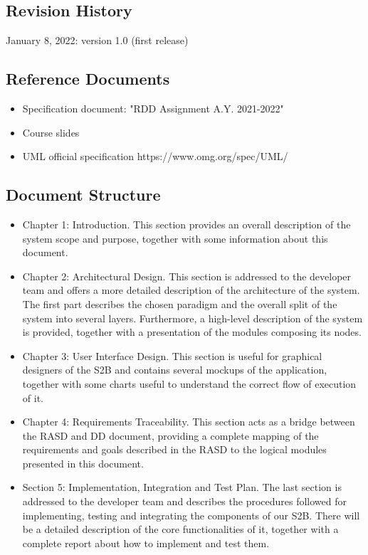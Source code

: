 \documentclass{article}
\begin{document}
\subsection{Revision History}
January 8, 2022: version 1.0 (first release)

\subsection{Reference Documents}
    \begin{itemize}
        \item Specification document: "RDD Assignment A.Y. 2021-2022"
        \item Course slides
        \item UML official specification https://www.omg.org/spec/UML/
    \end{itemize}


\newpage

\subsection{Document Structure}
    \begin{itemize}
        \item Chapter 1: Introduction. This section provides an overall description of the system scope and purpose, together with some information about this document.

        \item Chapter 2: Architectural Design. This section is addressed to the developer team and offers a more detailed description of the architecture of the system. The first part describes the chosen paradigm and the overall split of the system into several layers. Furthermore, a high-level description of the system is provided, together with a presentation of the modules composing its nodes. 

        \item Chapter 3: User Interface Design. This section is useful for graphical designers of the S2B and contains several mockups of the application, together with some charts useful to understand the correct flow of execution of it. 

        \item Chapter 4: Requirements Traceability. This section acts as a bridge between the RASD and DD document, providing a complete mapping of the requirements and goals described in the RASD to the logical modules presented in this document.

        \item Section 5: Implementation, Integration and Test Plan. The last section is addressed to the developer team and describes the procedures followed for implementing, testing and integrating the components of our S2B. There will be a detailed description of the core functionalities of it, together with a complete report about how to implement and test them.

    \end{itemize}
\end{document}
